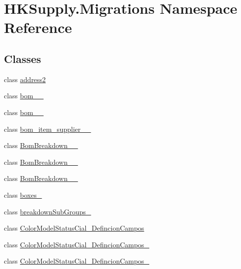 \hypertarget{namespace_h_k_supply_1_1_migrations}{}\section{H\+K\+Supply.\+Migrations Namespace Reference}
\label{namespace_h_k_supply_1_1_migrations}
\subsection*{Classes}
\begin{DoxyCompactItemize}
\item 
class \mbox{\hyperlink{class_h_k_supply_1_1_migrations_1_1address2}{address2}}
\item 
class \mbox{\hyperlink{class_h_k_supply_1_1_migrations_1_1bom__20170522__01}{bom\+\_\+\_}}
\item 
class \mbox{\hyperlink{class_h_k_supply_1_1_migrations_1_1bom__20170522__02}{bom\+\_\+\_}}
\item 
class \mbox{\hyperlink{class_h_k_supply_1_1_migrations_1_1bom__item__supplier__20170525__01}{bom\+\_\+item\+\_\+supplier\+\_\+\_}}
\item 
class \mbox{\hyperlink{class_h_k_supply_1_1_migrations_1_1_bom_breakdown__20170616__01}{Bom\+Breakdown\+\_\+\_}}
\item 
class \mbox{\hyperlink{class_h_k_supply_1_1_migrations_1_1_bom_breakdown__20170616__02}{Bom\+Breakdown\+\_\+\_}}
\item 
class \mbox{\hyperlink{class_h_k_supply_1_1_migrations_1_1_bom_breakdown__20170616__03}{Bom\+Breakdown\+\_\+\_}}
\item 
class \mbox{\hyperlink{class_h_k_supply_1_1_migrations_1_1boxes__01}{boxes\+\_}}
\item 
class \mbox{\hyperlink{class_h_k_supply_1_1_migrations_1_1breakdown_sub_groups__01}{breakdown\+Sub\+Groups\+\_}}
\item 
class \mbox{\hyperlink{class_h_k_supply_1_1_migrations_1_1_color_model_status_cial___defincion_campos}{Color\+Model\+Status\+Cial\+\_\+\+Defincion\+Campos}}
\item 
class \mbox{\hyperlink{class_h_k_supply_1_1_migrations_1_1_color_model_status_cial___defincion_campos__2}{Color\+Model\+Status\+Cial\+\_\+\+Defincion\+Campos\+\_}}
\item 
class \mbox{\hyperlink{class_h_k_supply_1_1_migrations_1_1_color_model_status_cial___defincion_campos__21}{Color\+Model\+Status\+Cial\+\_\+\+Defincion\+Campos\+\_}}

\end{DoxyCompactItemize}
